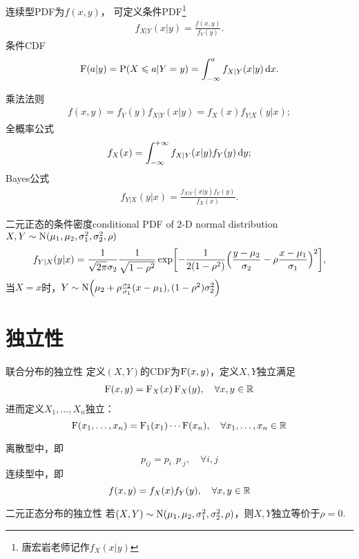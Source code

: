连续型PDF为$f(x,y)$，
可定义条件PDF\footnote{唐宏岩老师记作$f_X(x|y)$}
\begin{align}
	f_{X|Y}(x|y)=\frac{f(x,y)}{f_Y(y)}.
\end{align}
条件CDF
\[
	\operatorname{F}(a|y)=\operatorname{P}(X\leqslant a|Y=y)=\int_{-\infty}^af_{X|Y}(x|y)\mathop{}\!\mathrm{d} x.
\]%

乘法法则
\begin{align}
	f(x,y)=f_Y(y)f_{X|Y}(x|y)=f_X(x)f_{Y|X}(y|x);
\end{align}
全概率公式 
\begin{align}
	f_X(x)=\int_{-\infty}^{+\infty} f_{X|Y}(x|y)f_Y(y)\mathop{}\!\mathrm{d} y;
\end{align}
Bayes公式 
\begin{align}
	f_{Y|X}(y|x)=\frac{f_{X|Y}(x|y)f_Y(y)}{f_X(x)}.
\end{align}
\begin{example}{二元正态的条件密度}{conditional PDF of 2-D normal distribution}
	$X,Y\sim\operatorname{N}(\mu_1,\mu_2,\sigma_1^2,\sigma_2^2,\rho)$
	\begin{align*}
		f_{Y|X}(y|x)=\frac1{\sqrt{2\pi}\sigma_2}\frac1{\sqrt{1-\rho^2}}\exp\biggl[-\frac1{2(1-\rho^2)}\Bigl(\frac{y-\mu_2}{\sigma_2}-\rho\frac{x-\mu_1}{\sigma_1}\Bigr)^2\biggr],
	\end{align*}
	当$X=x$时，$Y\sim\operatorname{N}\Bigl(\mu_2+\rho\frac{\sigma_2}{\sigma_1}(x-\mu_1),(1-\rho^2)\sigma_2^2\Bigr)$
\end{example}
\section{独立性}
\begin{definition}{联合分布的独立性}{}
	定义$(X,Y)$的CDF为$\operatorname{F}(x,y)$，定义$X,Y$独立满足
	\begin{align}
		\operatorname{F}(x,y)=\operatorname{F}_X(x)\operatorname{F}_X(y),\quad\forall x,y\in\mathbb R
	\end{align}
	进而定义$X_1,\ldots,X_n$独立： 
	\[
		\operatorname{F}(x_1,\ldots,x_n)=\operatorname{F}_1(x_1)\cdots\operatorname{F}(x_n),\quad\forall x_1,\ldots,x_n\in\mathbb R
	\]
\end{definition}
离散型中，即
\[
	p_{ij}=p_{i\cdot}p_{\cdot j},\quad \forall i,j
\]
连续型中，即
\[
	f(x,y)=f_X(x)f_Y(y),\quad \forall x,y\in\mathbb R
\]
\begin{example}{二元正态分布的独立性}{}
	若$(X,Y)\sim\operatorname{N}(\mu_1,\mu_2,\sigma_1^2,\sigma_2^2,\rho)$，则$X,Y$独立等价于$\rho=0.$
\end{example}


